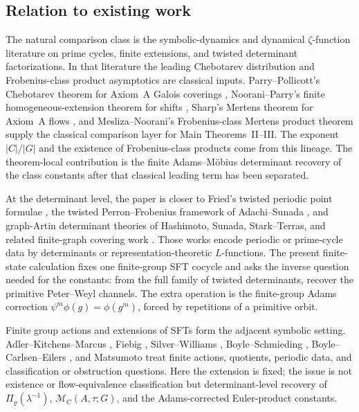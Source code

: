 \documentclass[11pt,a4paper]{amsart}
\theoremstyle{plain}
\theoremstyle{definition}
\theoremstyle{remark}
\begin{document}
\subsection{Relation to existing work}

The natural comparison class is the symbolic-dynamics and dynamical
\(\zeta\)-function literature on prime cycles, finite extensions, and
twisted determinant factorizations.  In that literature the leading
Chebotarev distribution and Frobenius-class product asymptotics are
classical inputs.  Parry--Pollicott's Chebotarev theorem for Axiom~A
Galois coverings \cite{ParryPollicott1986Chebotarev}, Noorani--Parry's
finite homogeneous-extension theorem for shifts
\cite{NooraniParry1992ChebotarevShifts}, Sharp's Mertens theorem for
Axiom~A flows \cite{Sharp1991Mertens}, and Mesliza--Noorani's
Frobenius-class Mertens product theorem
\cite{MeslizaNoorani1999FrobeniusMertens} supply the classical comparison layer
for Main Theorems~II--III.  The exponent \(|C|/|G|\) and the existence of
Frobenius-class products come from this lineage.  The theorem-local
contribution is the finite Adams--M\"obius determinant recovery of the class
constants after that classical leading term has been separated.

At the determinant level, the paper is closer to Fried's twisted periodic
point formulae \cite{Fried1983PeriodicPointsTwistedCoefficients,Fried1983HomologicalIdentitiesClosedOrbits}, the twisted
Perron--Frobenius framework of Adachi--Sunada
\cite{AdachiSunada1987TwistedPF}, and graph-Artin determinant theories of
Hashimoto, Sunada, Stark--Terras, and related finite-graph covering work
\cite{Hashimoto1989ZetaFiniteGraphs,Hashimoto1990ZetaLFunctionsFiniteGraphs,Hashimoto1992ArtinDensityPrimeCycles,Sunada1986LFunctionsGeometry,StarkTerras1996FiniteGraphsCoverings,StarkTerras2000FiniteGraphsCoveringsII,StarkTerras2007FiniteGraphsCoveringsIII}.  Those works encode periodic
or prime-cycle data by determinants or representation-theoretic
\(L\)-functions.  The present finite-state calculation fixes one
finite-group SFT cocycle and asks the inverse question needed for the
constants: from the full family of twisted determinants, recover the
primitive Peter--Weyl channels.  The extra operation is the finite-group
Adams correction \(\psi^m\phi(g)=\phi(g^m)\), forced by repetitions of a
primitive orbit.

Finite group actions and extensions of SFTs form the adjacent symbolic
setting.  Adler--Kitchens--Marcus \cite{AdlerKitchensMarcus1985FiniteGroupActions},
Fiebig \cite{Fiebig1993PeriodicFiniteGroupActions}, Silver--Williams
\cite{SilverWilliams2005InvariantFiniteGroupActions}, Boyle--Schmieding
\cite{BoyleSchmieding2017FiniteGroupExtensions}, Boyle--Carlsen--Eilers
\cite{BoyleCarlsenEilers2020FlowEquivalenceGSFT}, and Matsumoto
\cite{Matsumoto2016ExtensionsSubshiftsFiniteGroups} treat finite actions,
quotients, periodic data, and classification or obstruction questions.
Here the extension is fixed; the issue is not existence or
flow-equivalence classification but determinant-level recovery of
\(\Pi_\varrho(\lambda^{-1})\), \(\mathcal M_C(A,\tau;G)\), and the
Adams-corrected Euler-product constants.
\end{document}
